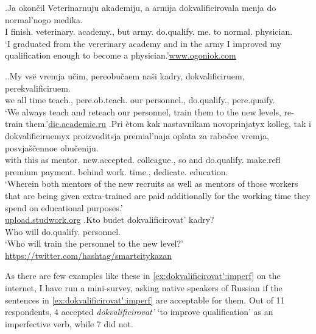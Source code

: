 \exg.\label{ex:dokvalificirovat':perf}Ja okon\v{c}il Veterinarnuju akademiju, a armija dokvalificirovala menja do normal'nogo medika.\\
I finish. veterinary. academy., but army. do.qualify. me. to normal. physician.\\
\trans `I graduated from the vererinary academy and in the army I improved my qualification enough to become a physician.'\hbox{}\hfill\hbox{\url{www.ogoniok.com}}

\ex.\label{ex:dokvalificirovat':imperf}\ag.\label{ex:dokvalificirovat':ongoing}My vs\"{e} vremja u\v{c}im, pereobu\v{c}aem na\v{s}i kadry, dokvalificiruem, perekvalificiruem.\\
we all time teach., pere.ob.teach. our personnel., do.qualify., pere.quaify.\\
\trans `We always teach and reteach our personnel, train them to the new levels, re-train them.'\hbox{}\hfill\hbox{\url{dic.academic.ru}}
\bg.\label{ex:dokvalificirovat':part}Pri \`{e}tom kak nastavnikam novoprinjatyx kolleg, tak i dokvalificiruemyx proizvoditsja premial'naja oplata za rabo\v{c}ee vremja, posvja\v{s}\v{c}ennoe obu\v{c}eniju.\\
with this as mentor. new.accepted. colleague., so and do.qualify. make.refl premium payment. behind work. time., dedicate. education.\\
\trans `Wherein both mentors of the new recruits as well as mentors of those workers that are being given extra-trained are paid additionally for the working time they spend on educational purposes.'\\\hbox{}\hfill\hbox{\url{upload.studwork.org}}
\bg.\label{ex:dokvalificirovat':future}Kto budet dokvalificirovat' kadry?\\
Who will do.qualify. personnel.\\
\trans `Who will train the personnel to the new level?'\\\hbox{}\hfill\hbox{\url{https://twitter.com/hashtag/smartcitykazan}}

\largerpage As there are few examples like these in \ref{ex:dokvalificirovat':imperf} on the internet, I have run a mini-survey, asking native speakers of Russian if the sentences in \ref{ex:dokvalificirovat':imperf} are acceptable for them. Out of 11 respondents, 4 accepted \textit{dokvalificirovat'} `to improve qualification' as an imperfective verb, while 7 did not.

